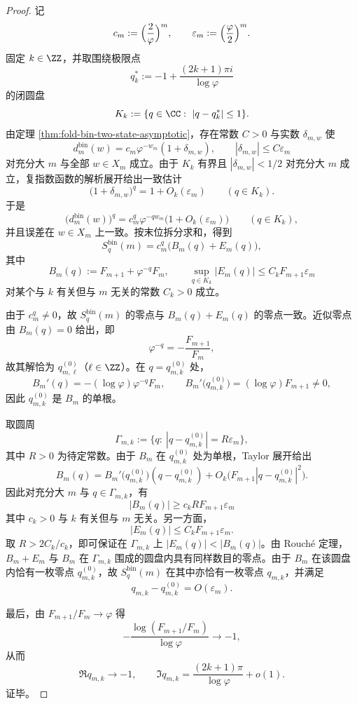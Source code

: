 \begin{proof}
记
\[
c_m:=\Bigl(\frac{2}{\varphi}\Bigr)^m,
\qquad
\varepsilon_m:=\Bigl(\frac{\varphi}{2}\Bigr)^m.
\]
固定 \(k\in\ZZ\)，并取围绕极限点
\[
q_k^\ast:=-1+\frac{(2k+1)\pi i}{\log\varphi}
\]
的闭圆盘
\[
K_k:=\{q\in\CC:\ |q-q_k^\ast|\le 1\}.
\]
由定理 \ref{thm:fold-bin-two-state-asymptotic}，存在常数 \(C>0\) 与实数 \(\delta_{m,w}\) 使
\[
d_m^{\mathrm{bin}}(w)=c_m\varphi^{-w_m}(1+\delta_{m,w}),
\qquad
|\delta_{m,w}|\le C\varepsilon_m
\]
对充分大 \(m\) 与全部 \(w\in X_m\) 成立。由于 \(K_k\) 有界且 \(|\delta_{m,w}|<1/2\) 对充分大 \(m\) 成立，复指数函数的解析展开给出一致估计
\[
\bigl(1+\delta_{m,w}\bigr)^q=1+O_k(\varepsilon_m)
\qquad (q\in K_k).
\]
于是
\[
\bigl(d_m^{\mathrm{bin}}(w)\bigr)^q
=
c_m^q\varphi^{-q w_m}\bigl(1+O_k(\varepsilon_m)\bigr)
\qquad (q\in K_k),
\]
并且误差在 \(w\in X_m\) 上一致。按末位拆分求和，得到
\[
S_q^{\mathrm{bin}}(m)
=
c_m^q\bigl(B_m(q)+E_m(q)\bigr),
\]
其中
\[
B_m(q):=F_{m+1}+\varphi^{-q}F_m,
\qquad
\sup_{q\in K_k}|E_m(q)|\le C_k F_{m+1}\varepsilon_m
\]
对某个与 \(k\) 有关但与 \(m\) 无关的常数 \(C_k>0\) 成立。

由于 \(c_m^q\neq 0\)，故 \(S_q^{\mathrm{bin}}(m)\) 的零点与 \(B_m(q)+E_m(q)\) 的零点一致。近似零点由 \(B_m(q)=0\) 给出，即
\[
\varphi^{-q}=-\frac{F_{m+1}}{F_m},
\]
故其解恰为 \(q_{m,\ell}^{(0)}\)（\(\ell\in\ZZ\)）。在 \(q=q_{m,k}^{(0)}\) 处，
\[
B_m'(q)=-(\log\varphi)\varphi^{-q}F_m,
\qquad
B_m'\!\bigl(q_{m,k}^{(0)}\bigr)=(\log\varphi)F_{m+1}\neq 0,
\]
因此 \(q_{m,k}^{(0)}\) 是 \(B_m\) 的单根。

取圆周
\[
\Gamma_{m,k}:=\{q:\ |q-q_{m,k}^{(0)}|=R\varepsilon_m\},
\]
其中 \(R>0\) 为待定常数。由于 \(B_m\) 在 \(q_{m,k}^{(0)}\) 处为单根，Taylor 展开给出
\[
B_m(q)=B_m'\!\bigl(q_{m,k}^{(0)}\bigr)(q-q_{m,k}^{(0)})+O_k\!\bigl(F_{m+1}|q-q_{m,k}^{(0)}|^2\bigr).
\]
因此对充分大 \(m\) 与 \(q\in \Gamma_{m,k}\)，有
\[
|B_m(q)|\ge c_k R F_{m+1}\varepsilon_m
\]
其中 \(c_k>0\) 与 \(k\) 有关但与 \(m\) 无关。另一方面，
\[
|E_m(q)|\le C_k F_{m+1}\varepsilon_m.
\]
取 \(R>2C_k/c_k\)，即可保证在 \(\Gamma_{m,k}\) 上 \(|E_m(q)|<|B_m(q)|\)。由 Rouch\'e 定理，\(B_m+E_m\) 与 \(B_m\) 在 \(\Gamma_{m,k}\) 围成的圆盘内具有同样数目的零点。由于 \(B_m\) 在该圆盘内恰有一枚零点 \(q_{m,k}^{(0)}\)，故 \(S_q^{\mathrm{bin}}(m)\) 在其中亦恰有一枚零点 \(q_{m,k}\)，并满足
\[
q_{m,k}-q_{m,k}^{(0)}=O(\varepsilon_m).
\]

最后，由 \(F_{m+1}/F_m\to \varphi\) 得
\[
-\frac{\log(F_{m+1}/F_m)}{\log\varphi}\to -1,
\]
从而
\[
\Re q_{m,k}\to -1,
\qquad
\Im q_{m,k}=\frac{(2k+1)\pi}{\log\varphi}+o(1).
\]
证毕。
\end{proof}

